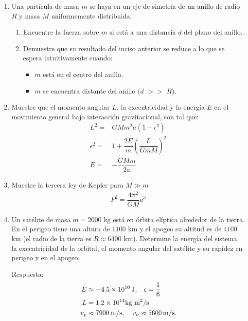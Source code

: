 \documentclass[11pt,twocolumn]{article}
\begin{document}
\begin{enumerate}
\item Una partícula de masa $m$ se haya en un eje de simetría de un anillo de radio $R$ y masa $M$ uniformemente distribuida.
\begin{enumerate}
\item Encuentre la fuerza sobre $m$ si está a una distancia $d$ del plano del anillo.
\item Demuestre que su resultado del inciso anterior se reduce a lo que se espera intuitivamente cuando:
\begin{itemize}
\item $m$ está en el centro del anillo.
\item $m$ se encuentra distante del anillo ($d$ $>>$ $R$). 
\end{itemize}
\end{enumerate}


\item Muestre que el momento angular $L$, la excentricidad  y la energía $E$ en el movimiento general bajo interacción gravitacional, son tal que:
\begin{align*}
L^2=&GMm^2a(1-\epsilon^2)\\
\epsilon^2=&1+\dfrac{2E}{m}\left(\dfrac{L}{GmM}\right)^2\\
E=&-\dfrac{GMm}{2a}
\end{align*}

\item Muestre la tercera ley de Kepler para $M\gg m$
\begin{align*}
P^2=\dfrac{4\pi^2}{GM}a^3
\end{align*}

\item Un satélite de masa $m = 2000$ kg está en órbita elíptica alrededor de la tierra. 
En el perigeo tiene una altura de $1100$ km y el apogeo su altitud es de $4100$ km (el radio de la tierra es $R\approx 6400$ km). Determine la energía del sistema, la excentricidad  de la  orbital, el momento angular del satélite y su rapidez en perigeo y en el apogeo.

Respuesta:
\begin{align*}
E&\approx-4.5\times 10^{10}\,\text{J},\hspace{0.3 cm} \epsilon=\dfrac{1}{6}\,\\
L&=1.2\times 10^{14} \text{kg m$^2/$s}\\
v_p&\approx7900\, \text{m/s},\;\hspace{0.3 cm} v_a\approx5600\, \text{m/s}.
\end{align*}


\end{enumerate}
\end{document}
